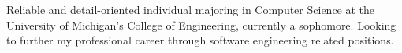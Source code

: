 \documentclass[letter,10pt]{article}
\begin{document}


\text Reliable and detail-oriented individual majoring in Computer Science at the University of Michigan's College of Engineering, currently a sophomore. Looking to further my professional career through software engineering related positions.
\end{document}
